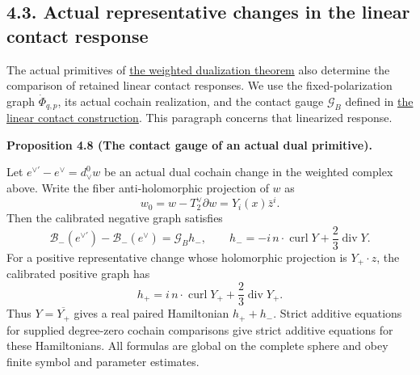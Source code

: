 \documentclass[
  english,
  11pt,
  reqno]{amsart}
\makeatletter
\newcommand{\pandocstatementheading}[1]{%
  \par\if@nobreak\else
    \addpenalty{\@beginparpenalty}%
    \addvspace{.5\baselineskip plus .2\baselineskip minus .2\baselineskip}%
  \fi
  {\normalfont\bfseries #1\par}%
  \nobreak\@afterindenttrue\@afterheading
}
\makeatother
\begin{document}
\subsection{4.3. Actual representative changes in the linear contact
response}\label{actual-representative-changes-in-the-linear-contact-response}\label{sec:online-dual-representative-contact-comparison}

The actual primitives of
\hyperref[thm:online-actual-weighted-negative-dual]{the weighted
dualization theorem} also determine the comparison of retained linear
contact responses. We use the fixed-polarization graph
\(\dot\Phi_{q,p}\), its actual cochain realization, and the contact
gauge \(\mathcal G_B\) defined in
\hyperref[thm:online-actual-linear-contact-graph]{the linear contact
construction}. This paragraph concerns that linearized response.

\pandocstatementheading{\leavevmode{}\label{prop:online-dual-primitive-linear-contact-gauge}Proposition 4.8 (The contact gauge of an actual dual primitive).}

Let \(e^{\vee\prime}-e^\vee=d_\vee^0w\) be an actual dual cochain change
in the weighted complex above. Write the fiber anti-holomorphic
projection of \(w\) as%
\[
w_0=w-T_2^\vee\partial w=Y_i(x)\bar z^i.
\] Then the calibrated negative graph satisfies%
 \[
\mathcal B_-(e^{\vee\prime})-\mathcal B_-(e^\vee)
=\mathcal G_B h_-,
\qquad
h_-=-i\,n\cdot\operatorname{curl}Y+\frac23\operatorname{div}Y.
\] For a positive representative change whose holomorphic projection is
\(Y_+\cdot z\), the calibrated positive graph has%
\[
h_+=i\,n\cdot\operatorname{curl}Y_+
                   +\frac23\operatorname{div}Y_+ .
\] Thus \(Y=\overline{Y_+}\) gives a real paired Hamiltonian
\(h_++h_-\). Strict additive equations for supplied degree-zero cochain
comparisons give strict additive equations for these Hamiltonians. All
formulas are global on the complete sphere and obey finite symbol and
parameter estimates.
\end{document}
